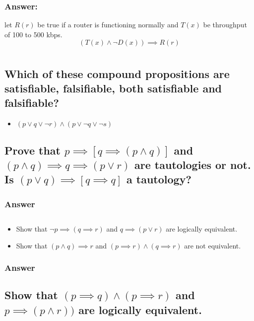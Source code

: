 \documentclass[titlepage]{article}\usepackage[]{graphicx}\usepackage[]{color}
\begin{document}
  \subsubsection{Answer:}
  let $R(r)$ be true if a router is functioning normally and $T(x)$ be throughput of 100 to 500 kbps. 
  \[ (T(x) \land \lnot D(x)) \implies R(r) \]


\section{ }
  \subsection{Which of these compound propositions are satisfiable, falsifiable,
  both satisfiable and falsifiable?}
    \begin{itemize}
      \item \( ( p \lor q \lor \lnot r) \land ( p \lor \lnot q \lor \lnot s) \)
    \end{itemize}


  \subsection{ Prove that $ p \implies [q \implies (p \land q)] $ and $ (p
      \land q) \implies q \implies (p \lor r) $ are tautologies or not. Is $( p
      \lor q) \implies [q \implies q] $ a tautology? } 
  \subsubsection{Answer}

  \subsection{ }
  \begin{itemize}
      \item Show that $\lnot p \implies (q \implies r) $ and 
        $ q \implies (p \lor r)$ are logically equivalent.
      \item Show that $( p \land q) \implies r$ and $(p \implies r) \land (q
        \implies r)$ are not equivalent.
    \end{itemize}


  \subsubsection{Answer}

  \subsection{ Show that $ ( p \implies q ) \land ( p \implies r ) $ and 
  $ p \implies (p \land r))$ are logically equivalent.}
\end{document}
